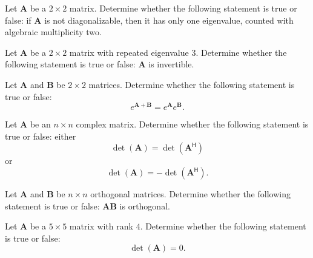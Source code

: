 \begin{problem}
Let $\mathbf A$ be a $2\times2$ matrix. Determine whether the following statement is true or false: if $\mathbf A$ is not diagonalizable, then it has only one eigenvalue, counted with algebraic multiplicity two.
\end{problem}

\begin{problem}
Let $\mathbf A$ be a $2\times2$ matrix with repeated eigenvalue $3$. Determine whether the following statement is true or false: $\mathbf A$ is invertible.
\end{problem}

\begin{problem}
Let $\mathbf A$ and $\mathbf B$ be $2\times2$ matrices. Determine whether the following statement is true or false:
\[
e^{\mathbf A+\mathbf B}=e^{\mathbf A}e^{\mathbf B}.
\]
\end{problem}

\begin{problem}
Let $\mathbf A$ be an $n\times n$ complex matrix. Determine whether the following statement is true or false: either
\[
\det(\mathbf A)=\det(\mathbf A^{\mathsf H})
\]
or
\[
\det(\mathbf A)=-\det(\mathbf A^{\mathsf H}).
\]
\end{problem}

\begin{problem}
Let $\mathbf A$ and $\mathbf B$ be $n\times n$ orthogonal matrices. Determine whether the following statement is true or false: $\mathbf A\mathbf B$ is orthogonal.
\end{problem}

\begin{problem}
Let $\mathbf A$ be a $5\times5$ matrix with rank $4$. Determine whether the following statement is true or false:
\[
\det(\mathbf A)=0.
\]
\end{problem}

